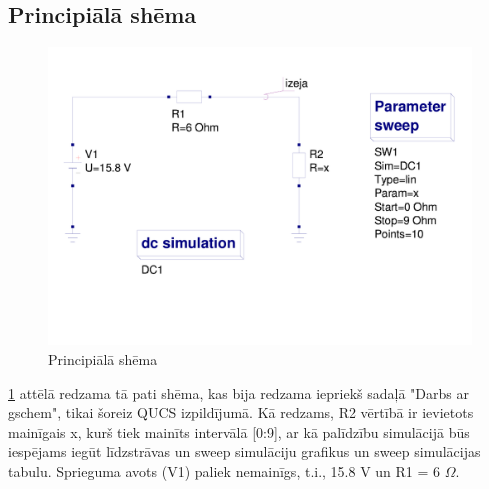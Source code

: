 \documentclass{report}
\begin{document}
    \subsection{Principiālā shēma}
        \begin{figure}[b!]
            \includegraphics[scale=0.35]{02.png}
            \caption{Principiālā shēma}
            \label{att:qucs1}
        \end{figure}
       
        \justify
       \ref{att:qucs1} attēlā redzama tā pati shēma, kas bija redzama iepriekš sadaļā "Darbs ar gschem", tikai šoreiz QUCS izpildījumā. Kā redzams, R2 vērtībā ir ievietots mainīgais x, kurš tiek mainīts intervālā [0:9], ar kā palīdzību simulācijā būs iespējams iegūt līdzstrāvas un sweep simulāciju grafikus un sweep simulācijas tabulu. Sprieguma avots (V1) paliek nemainīgs, t.i., 15.8 V un R1 = 6 $\Omega$.
     
    
\newpage
   
\end{document}
